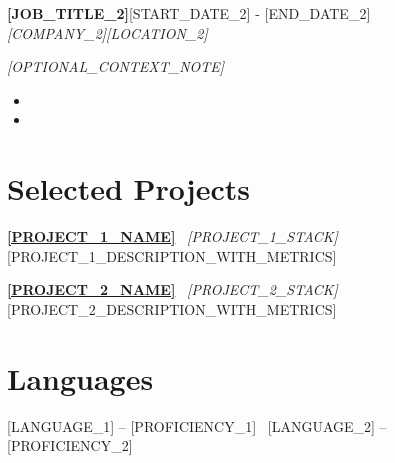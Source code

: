 \documentclass[10pt,a4paper]{article}
\newcommand{\entry}[4]{
  \textbf{#1}\hfill{\small #2}\\[-1pt]
  \textit{#3}\hfill{\small\textit{#4}}\par\vspace{-1.5pt}
}
\newcommand{\project}[3]{
  \textbf{#1} \textbar\ {\small\color{muted}\textit{#2}}\\[-1.5pt]
  #3\par\vspace{1pt}
}
\begin{document}
\entry{[JOB_TITLE_2]}{[START_DATE_2] - [END_DATE_2]}{[COMPANY_2]}{[LOCATION_2]}
{\small\color{muted}\textit{[OPTIONAL_CONTEXT_NOTE]}}\par\vspace{-1.5pt}
\begin{itemize}
  \item [BULLET_1]
  \item [BULLET_2]
\end{itemize}

\section{Selected Projects}
\project{\href{[PROJECT_1_URL]}{[PROJECT_1_NAME]}}{[PROJECT_1_STACK]}{[PROJECT_1_DESCRIPTION_WITH_METRICS]}

\project{\href{[PROJECT_2_URL]}{[PROJECT_2_NAME]}}{[PROJECT_2_STACK]}{[PROJECT_2_DESCRIPTION_WITH_METRICS]}

\section{Languages}
[LANGUAGE_1] -- [PROFICIENCY_1] \textbar\ [LANGUAGE_2] -- [PROFICIENCY_2]
\end{document}
